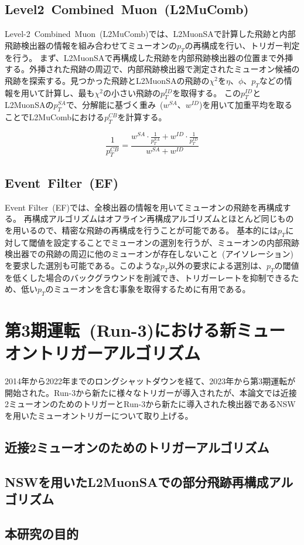 \subsection{Level2~Combined~Muon~(L2MuComb)}\label{chapter3-2-3}
Level-2~Combined~Muon~(L2MuComb)では、L2MuonSAで計算した飛跡と内部飛跡検出器の情報を組み合わせてミューオンの$p_T$の再構成を行い、トリガー判定を行う。
まず、L2MuonSAで再構成した飛跡を内部飛跡検出器の位置まで外挿する。外挿された飛跡の周辺で、内部飛跡検出器で測定されたミューオン候補の飛跡を探索する。見つかった飛跡とL2MuonSAの飛跡の$\chi^2$を$\eta$、$\phi$、$p_T$などの情報を用いて計算し、最も$\chi^2$の小さい飛跡の$p_T^{ID}$を取得する。
この$p_T^{ID}$とL2MuonSAの$p_T^{SA}$で、分解能に基づく重み~($w^{SA}$、$w^{ID}$)を用いて加重平均を取ることでL2MuCombにおける$p_T^{CB}$を計算する。

\begin{equation}
    \frac{1}{p_T^{C B}}=\frac{w^{S A} \cdot \frac{1}{p_T^{S A}}+w^{I D} \cdot \frac{1}{p_T^{I D}}}{w^{S A}+w^{I D}}
\end{equation}

\subsection{Event~Filter~(EF)}\label{chapter3-2-4}
Event Filter~(EF)では、全検出器の情報を用いてミューオンの飛跡を再構成する。
再構成アルゴリズムはオフライン再構成アルゴリズムとほとんど同じものを用いるので、精密な飛跡の再構成を行うことが可能である。
基本的には$p_T$に対して閾値を設定することでミューオンの選別を行うが、ミューオンの内部飛跡検出器での飛跡の周辺に他のミューオンが存在しないこと~(アイソレーション)を要求した選別も可能である。このような$p_T$以外の要求による選別は、$p_T$の閾値を低くした場合のバックグラウンドを削減でき、トリガーレートを抑制できるため、低い$p_T$のミューオンを含む事象を取得するために有用である。

\section{第3期運転~(Run-3)における新ミューオントリガーアルゴリズム}\label{chapter3-3}
2014年から2022年までのロングシャットダウンを経て、2023年から第3期運転が開始された。Run-3から新たに様々なトリガーが導入されたが、本論文では近接2ミューオンのためのトリガーとRun-3から新たに導入された検出器であるNSWを用いたミューオントリガーについて取り上げる。

\subsection{近接2ミューオンのためのトリガーアルゴリズム}\label{chapter3-3-1}

\subsection{NSWを用いたL2MuonSAでの部分飛跡再構成アルゴリズム}\label{chapter3-3-2}

\subsection{本研究の目的}\label{chapter3-4}